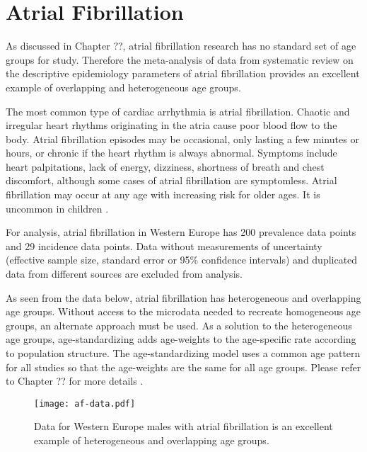 \chapter{Atrial Fibrillation}
\label{applications-age_groups}

As discussed in Chapter ??, atrial fibrillation research has no standard set of age groups for study.  Therefore the meta-analysis of data from systematic review on the descriptive epidemiology parameters of atrial fibrillation provides an excellent example of overlapping and heterogeneous age groups.

The most common type of cardiac arrhythmia is atrial fibrillation.  Chaotic and irregular heart rhythms originating in the atria cause poor blood flow to the body.  Atrial fibrillation episodes may be occasional, only lasting a few minutes or hours, or chronic if the heart rhythm is always abnormal.  Symptoms include heart palpitations, lack of energy, dizziness, shortness of breath and chest discomfort, although some cases of atrial fibrillation are symptomless.  Atrial fibrillation may occur at any age with increasing risk for older ages.  It is uncommon in children \cite{rich_epidemiology_2009, rho_asymptomoatic_2005, american_acc_2006, radford_atiral_1977}.

For analysis, atrial fibrillation in Western Europe has 200 prevalence data points and 29 incidence data points.  Data without measurements of uncertainty (effective sample size, standard error or 95\% confidence intervals) and duplicated data from different sources are excluded from analysis.

As seen from the data below, atrial fibrillation has heterogeneous and overlapping age groups.  Without access to the microdata needed to recreate homogeneous age groups, an alternate approach must be used.  As a solution to the heterogeneous age groups, age-standardizing adds age-weights to the age-specific rate according to population structure.  The age-standardizing model uses a common age pattern for all studies so that the age-weights are the same for all age groups.  Please refer to Chapter ?? for more details .

    \begin{figure}[h]
        \begin{center}
            \texttt{[image: af-data.pdf]}
            \caption{Data for Western Europe males with atrial fibrillation is an excellent example of heterogeneous and overlapping age groups.}
            \label{fig:app-af data}
        \end{center}
    \end{figure}
    
